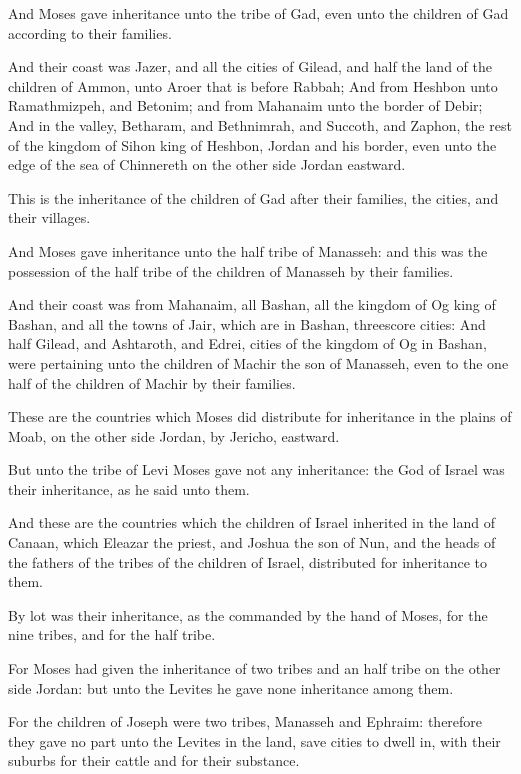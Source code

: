 \Verse And Moses gave inheritance unto the tribe of Gad, even unto the children of Gad according to their families.

\Verse And their coast was Jazer, and all the cities of Gilead, and half the land of the children of Ammon, unto Aroer that is before Rabbah; \Verse And from Heshbon unto Ramathmizpeh, and Betonim; and from Mahanaim unto the border of Debir; \Verse And in the valley, Betharam, and Bethnimrah, and Succoth, and Zaphon, the rest of the kingdom of Sihon king of Heshbon, Jordan and his border, even unto the edge of the sea of Chinnereth on the other side Jordan eastward.

\Verse This is the inheritance of the children of Gad after their families, the cities, and their villages.

\Verse And Moses gave inheritance unto the half tribe of Manasseh: and this was the possession of the half tribe of the children of Manasseh by their families.

\Verse And their coast was from Mahanaim, all Bashan, all the kingdom of Og king of Bashan, and all the towns of Jair, which are in Bashan, threescore cities: \Verse And half Gilead, and Ashtaroth, and Edrei, cities of the kingdom of Og in Bashan, were pertaining unto the children of Machir the son of Manasseh, even to the one half of the children of Machir by their families.

\Verse These are the countries which Moses did distribute for inheritance in the plains of Moab, on the other side Jordan, by Jericho, eastward.

\Verse But unto the tribe of Levi Moses gave not any inheritance: the \LORD God of Israel was their inheritance, as he said unto them.


\Chapter
\Verse And these are the countries which the children of Israel inherited in the land of Canaan, which Eleazar the priest, and Joshua the son of Nun, and the heads of the fathers of the tribes of the children of Israel, distributed for inheritance to them.

\Verse By lot was their inheritance, as the \LORD commanded by the hand of Moses, for the nine tribes, and for the half tribe.

\Verse For Moses had given the inheritance of two tribes and an half tribe on the other side Jordan: but unto the Levites he gave none inheritance among them.

\Verse For the children of Joseph were two tribes, Manasseh and Ephraim: therefore they gave no part unto the Levites in the land, save cities to dwell in, with their suburbs for their cattle and for their substance.


